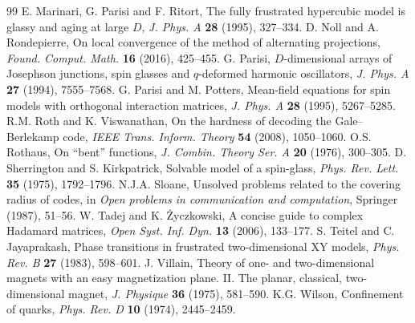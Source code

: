 \documentclass[11pt,a4paper]{article}
\theoremstyle{remark}
\begin{document}
\begin{thebibliography}{99}
E. Marinari, G. Parisi and F. Ritort, The fully frustrated hypercubic model is glassy and aging at large $D$, \emph{J. Phys. A} \textbf{28} (1995), 327--334.
D. Noll and A. Rondepierre, On local convergence of the method of alternating projections, \emph{Found. Comput. Math.} \textbf{16} (2016), 425--455.
G. Parisi, $D$-dimensional arrays of Josephson junctions, spin glasses and $q$-deformed harmonic oscillators, \emph{J. Phys. A} \textbf{27} (1994), 7555--7568.
G. Parisi and M. Potters, Mean-field equations for spin models with orthogonal interaction matrices, \emph{J. Phys. A} \textbf{28} (1995), 5267--5285.
R.M. Roth and K. Viswanathan, On the hardness of decoding the Gale--Berlekamp code, \emph{IEEE Trans. Inform. Theory} \textbf{54} (2008), 1050--1060.
O.S. Rothaus, On ``bent'' functions, \emph{J. Combin. Theory Ser. A} \textbf{20} (1976), 300--305.
D. Sherrington and S. Kirkpatrick, Solvable model of a spin-glass, \emph{Phys. Rev. Lett.} \textbf{35} (1975), 1792--1796.
N.J.A. Sloane, Unsolved problems related to the covering radius of codes, in \emph{Open problems in communication and computation}, Springer (1987), 51--56.
W. Tadej and K. \.Zyczkowski, A concise guide to complex Hadamard matrices, \emph{Open Syst. Inf. Dyn.} \textbf{13} (2006), 133--177.
S. Teitel and C. Jayaprakash, Phase transitions in frustrated two-dimensional XY models, \emph{Phys. Rev. B} \textbf{27} (1983), 598--601.
J. Villain, Theory of one- and two-dimensional magnets with an easy
magnetization plane. II. The planar, classical, two-dimensional magnet,
\emph{J. Physique} \textbf{36} (1975), 581--590.
K.G. Wilson, Confinement of quarks, \emph{Phys. Rev. D} \textbf{10} (1974), 2445--2459.
\end{thebibliography}
\end{document}
